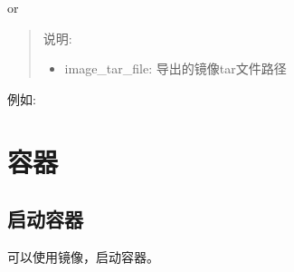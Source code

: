\documentclass[letterpaper,10pt,english]{sphinxmanual}
\begin{document}
or

\begin{sphinxVerbatim}[commandchars=\\\{\}]
    
\end{sphinxVerbatim}
\begin{quote}

说明:
\begin{itemize}
\item {} 
image\_tar\_file: 导出的镜像tar文件路径

\end{itemize}
\end{quote}

例如:

\begin{sphinxVerbatim}[commandchars=\\\{\}]
    
    
\end{sphinxVerbatim}


\section{容器}
\label{\detokenize{docker/basic_cmd:id11}}

\subsection{启动容器}
\label{\detokenize{docker/basic_cmd:id12}}
可以使用镜像，启动容器。
\end{document}
